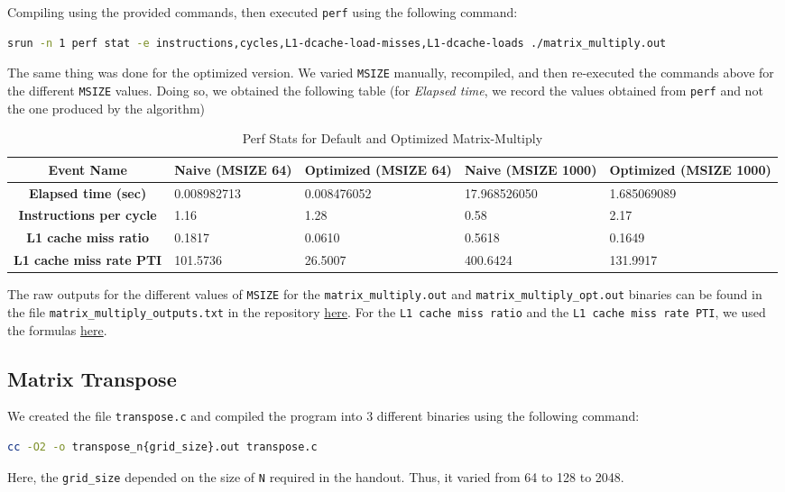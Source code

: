 \documentclass[a4paper,10pt]{article}
\begin{document}
Compiling using the provided commands, then executed \verb|perf| using the following command: 
\begin{lstlisting}[language=bash,basicstyle=\tiny\ttfamily]
srun -n 1 perf stat -e instructions,cycles,L1-dcache-load-misses,L1-dcache-loads ./matrix_multiply.out
\end{lstlisting}
The same thing was done for the optimized version. We varied \verb|MSIZE| manually, recompiled, and then re-executed the commands above for the different \verb|MSIZE| values. 
Doing so, we obtained the following table (for \textit{Elapsed time}, we record the values obtained from \verb|perf| and not the one produced by the algorithm) 
\begin{table}[h!]
\centering
\begin{tabular}{|c|p{2.5cm}|p{2.5cm}|p{2.5cm}|p{2.5cm}|}
\hline
\textbf{Event Name} & \textbf{Naive (MSIZE 64)} & \textbf{Optimized (MSIZE 64)} & \textbf{Naive (MSIZE 1000)} & \textbf{Optimized (MSIZE 1000)} \\
\hline
\textbf{Elapsed time (sec)} & 0.008982713 & 0.008476052 & 17.968526050 & 1.685069089 \\
\hline
\textbf{Instructions per cycle} & 1.16 & 1.28 & 0.58 & 2.17 \\
\hline
\textbf{L1 cache miss ratio} & 0.1817 & 0.0610 & 0.5618 & 0.1649 \\
\hline
\textbf{L1 cache miss rate PTI} & 101.5736 & 26.5007 & 400.6424 & 131.9917  \\
\hline
\end{tabular}
\caption{Perf Stats for Default and Optimized Matrix-Multiply}
\end{table}
The raw outputs for the different values of \verb|MSIZE| for the \verb|matrix_multiply.out| and \verb|matrix_multiply_opt.out| binaries can be found in the file \verb|matrix_multiply_outputs.txt| in the repository \href{https://github.com/paulmyr/DD2356-MethodsHPC/blob/master/2_hpc_arch_perf_model/exercise4/matrix_multiply_outputs.txt}{here}. For the \verb|L1 cache miss ratio| and the \verb|L1 cache miss rate PTI|, we used the formulas \href{https://canvas.kth.se/courses/53216/pages/tutorial-the-perf-tool?module_item_id=1067474}{here}.


\subsection{Matrix Transpose}
We created the file \verb|transpose.c| and compiled the program into 3 different binaries using the following command: 
\begin{lstlisting}[language=bash,basicstyle=\ttfamily]
cc -O2 -o transpose_n{grid_size}.out transpose.c
\end{lstlisting}
Here, the \verb|grid_size| depended on the size of \verb|N| required in the handout. Thus, it varied from 64 to 128 to 2048. 
\end{document}
